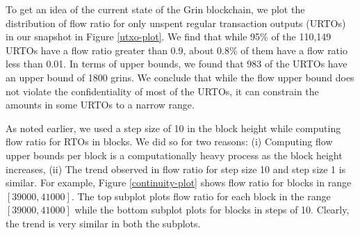 %

To get an idea of the current state of the Grin blockchain, we plot the distribution of flow ratio for only unspent regular transaction outputs (URTOs) in our snapshot in Figure \ref{utxo-plot}. We find that while 95\% of the 110,149 URTOs have a flow ratio greater than 0.9, about 0.8\% of them have a flow ratio less than 0.01. In terms of upper bounds, we found that 983 of the URTOs have an upper bound of 1800 grins. We conclude that while the flow upper bound does not violate the confidentiality of most of the URTOs, it can constrain the amounts in some URTOs to a narrow range.

As noted earlier, we used a step size of 10 in the block height while computing flow ratio for RTOs in blocks.
We did so for two reasons: (i) Computing flow upper bounds per block is a computationally heavy process as the block height increases,
(ii) The trend observed in flow ratio for step size 10 and step size 1 is similar.
For example, Figure \ref{continuity-plot} shows flow ratio for blocks in range $[39000, 41000]$.
The top subplot plots flow ratio for each block in the range $[39000, 41000]$ while the bottom subplot plots for blocks in steps of 10.
Clearly, the trend is very similar in both the subplots.

